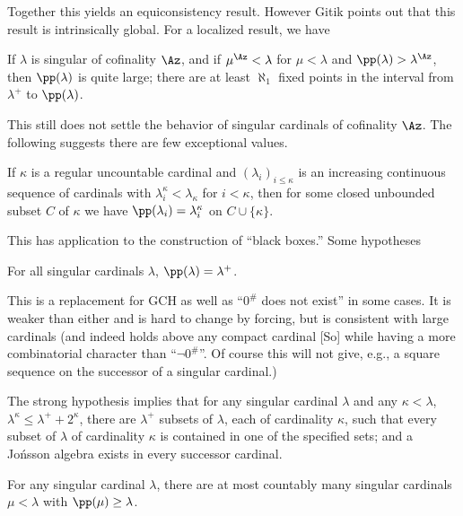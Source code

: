 Together  this yields an equiconsistency result.
 However  Gitik points out that
this result is intrinsically global. For a localized 
result, we have
 
 If $\lambda$ is singular of 
cofinality $\Az$, and if
$\mu^\Az<\lambda$ for $\mu<\lambda$ and 
$\pp(\lambda)>\lambda^\Az$,
then $\pp(\lambda)$ is quite large\RM; there are at least 
$\aleph_1$
fixed points in the interval from $\lambda^+$ to 
$\pp(\lambda)$.
\endproclaim
 
This still does not settle the behavior of singular 
cardinals of
cofinality $\Az$. The following suggests there are few 
exceptional
values.
 
If $\kappa$ is a regular uncountable cardinal and 
$(\lambda_i)_{i\le
\kappa}$ is an increasing continuous sequence of cardinals 
with
$\lambda_i^\kappa<\lambda_\kappa$ for $i<\kappa$, then for 
some closed
unbounded subset $C$ of $\kappa$ we have
$\pp(\lambda_i)=\lambda_i^\kappa$ on $C\cup\{\kappa\}$.
\endproclaim
 
This has application to the construction of ``black boxes.''
{} Some hypotheses\endheading
 
For all singular cardinals $\lambda$, 
$\pp(\lambda)=\lambda^+$.
\endproclaim
 
This is a replacement for GCH as well as ``$0^{\#}$ does 
not exist''
in some cases. It is weaker than either and is hard to 
change by
forcing, but is consistent with large cardinals (and 
indeed holds
above any compact cardinal [So] while having a more 
combinatorial
character than ``$\neg0^{\#}$''. Of course this will not 
give, e.g., a square
sequence on the successor of a singular cardinal.)
 
 The strong hypothesis implies 
that for any singular
cardinal $\lambda$ and any $\kappa<\lambda$,
 $\lambda^\kappa\le \lambda^++2^\kappa$,
there are $\lambda^+$
subsets of $\lambda$, each of cardinality $\kappa$, such 
that every
subset of $\lambda$ of cardinality $\kappa$ is contained 
in one of the
specified sets\RM; and a Jo\'nsson algebra exists in every 
successor
cardinal.
\endproclaim
 
For any singular cardinal $\lambda$,
there are at most countably many singular cardinals 
$\mu<\lambda$ with
$\pp(\mu)\ge \lambda$.
\endproclaim
 
